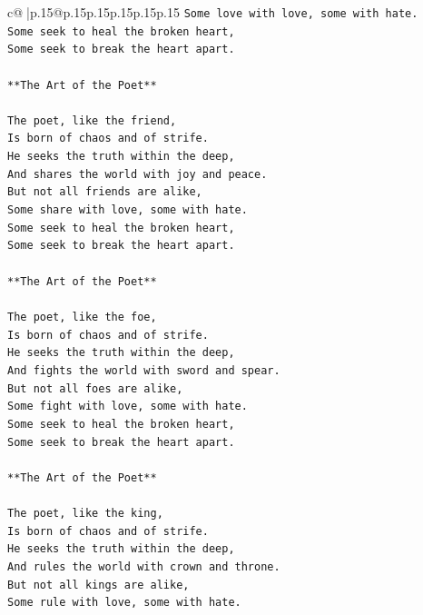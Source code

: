 \documentclass{article}
\begin{document}
{\begin{supertabular}{c@{$\;$}|p{.15\linewidth}@{}p{.15\linewidth}p{.15\linewidth}p{.15\linewidth}p{.15\linewidth}p{.15\linewidth}}
{{{\texttt{Some love with love, some with hate.} \\
\texttt{Some seek to heal the broken heart,} \\
\texttt{Some seek to break the heart apart.} \\
\\ 
\texttt{**The Art of the Poet**} \\
\\ 
\texttt{The poet, like the friend,} \\
\texttt{Is born of chaos and of strife.} \\
\texttt{He seeks the truth within the deep,} \\
\texttt{And shares the world with joy and peace.} \\
\texttt{But not all friends are alike,} \\
\texttt{Some share with love, some with hate.} \\
\texttt{Some seek to heal the broken heart,} \\
\texttt{Some seek to break the heart apart.} \\
\\ 
\texttt{**The Art of the Poet**} \\
\\ 
\texttt{The poet, like the foe,} \\
\texttt{Is born of chaos and of strife.} \\
\texttt{He seeks the truth within the deep,} \\
\texttt{And fights the world with sword and spear.} \\
\texttt{But not all foes are alike,} \\
\texttt{Some fight with love, some with hate.} \\
\texttt{Some seek to heal the broken heart,} \\
\texttt{Some seek to break the heart apart.} \\
\\ 
\texttt{**The Art of the Poet**} \\
\\ 
\texttt{The poet, like the king,} \\
\texttt{Is born of chaos and of strife.} \\
\texttt{He seeks the truth within the deep,} \\
\texttt{And rules the world with crown and throne.} \\
\texttt{But not all kings are alike,} \\
\texttt{Some rule with love, some with hate.} \\
}}}
\end{supertabular}}
\end{document}
